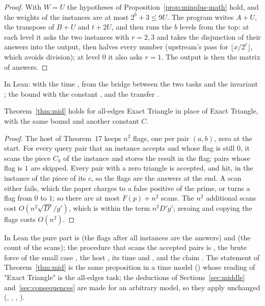 \begin{proof}
With \(W=U\) the hypotheses of Proposition~\ref{prop:minplus-math} hold, and
the weights of the instances are at most \(2^{b}+3\le9U\).  The program writes
\(A+U\), the transpose of \(B+U\) and \(t+2U\), and then runs the \(b\) levels
from the top: at each level it asks the two instances with \(r=2,3\) and takes
the disjunction of their answers into the output, then halves every number
(upstream's pass for \(\lfloor x/2^{\ell}\rfloor\), which avoids division); at
level \(0\) it also asks \(r=1\).  The output is then the matrix of answers.
\end{proof}

In Lean:  with the time , from the
bridge  between the two tasks and the invariant
; the bound  with the constant
, and the transfer .

\begin{theorem}\label{thm:mid-ae}
Theorem~\ref{thm:mid} holds for all-edges Exact Triangle in place of Exact
Triangle, with the same bound and another constant \(C\).
\end{theorem}

\begin{proof}
The host of Theorem~17 keeps \(n^{2}\) flags, one per pair \((a,b)\), zero at
the start.  For every query pair that an instance accepts and whose flag is
still \(0\), it scans the piece \(C_k\) of the instance and stores the result
in the flag; pairs whose flag is \(1\) are skipped.  Every pair with a zero
triangle is accepted, and hit, in the instance of the piece of its \(c\), so
the flags are the answers at the end.  A scan either fails, which the paper
charges to a false positive of the prime, or turns a flag from \(0\) to \(1\);
so there are at most \(F(p)+n^{2}\) scans.  The \(n^{2}\) additional scans cost
\(O(n^{2}\sqrt{D'}/g')\), which is within the term \(n^{2}D'g'\); zeroing and
copying the flags costs \(O(n^{2})\).
\end{proof}

In Lean the pure part is  (the flags after all instances are
the answers) and  (the count of the scans); the
procedure that scans the accepted pairs is , the brute
force of the small case , the host , its
time  and , and the claim
.  The statement of Theorem~\ref{thm:mid} is the
same proposition  in a time model () whose
reading of "Exact Triangle" is the all-edges task; the deductions of
Sections~\ref{sec:middle} and~\ref{sec:consequences} are made for an arbitrary
model, so they apply unchanged (, ,
, ).

